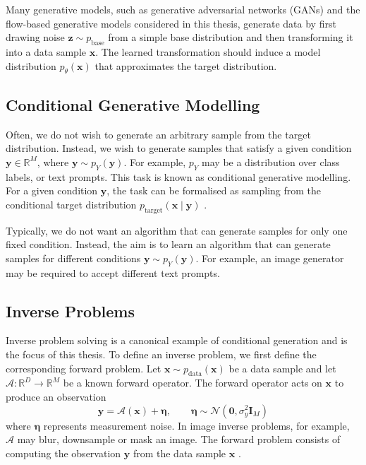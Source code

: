 \documentclass[12pt,a4paper]{report}
\begin{document}
Many generative models, such as generative adversarial networks (GANs) \parencite{GAN} and the flow-based generative models \parencite{NF_survey,lipman_FM,geng2025meanflowsonestepgenerative} considered in this thesis, generate data by first drawing noise $\mathbf{z}\sim p_{\mathrm{base}}$ from a simple base distribution and then transforming it into a data sample $\mathbf{x}$. The learned transformation should induce a model distribution $p_{\theta}(\mathbf{x})$ that approximates the target distribution. 

\subsection{Conditional Generative Modelling}
\label{subsec:conditional_generative_modelling}

Often, we do not wish to generate an arbitrary sample from the target distribution. Instead, we wish to generate samples that satisfy a given condition $\mathbf{y}\in\mathbb{R}^{M}$, where $\mathbf{y}\sim p_{Y}(\mathbf{y})$. For example, $p_{Y}$ may be a distribution over class labels, or text prompts. This task is known as conditional generative modelling. For a given condition $\mathbf{y}$, the task can be formalised as sampling from the conditional target distribution $p_{\mathrm{target}}(\mathbf{x}\mid\mathbf{y})$ \parencite{mit_FM}.

Typically, we do not want an algorithm that can generate samples for only one fixed condition. Instead, the aim is to learn an algorithm that can generate samples for different conditions $\mathbf{y}\sim p_Y(\mathbf{y})$. For example, an image generator may be required to accept different text prompts.

\subsection{Inverse Problems}
\label{subsec:inverse_problems}

Inverse problem solving is a canonical example of conditional generation and is the focus of this thesis. To define an inverse problem, we first define the corresponding forward problem. Let $\mathbf{x}\sim p_{\mathrm{data}}(\mathbf{x})$ be a data sample and let $\mathcal{A}:\mathbb{R}^{D}\rightarrow\mathbb{R}^{M}$ be a known forward operator. The forward operator acts on $\mathbf{x}$ to produce an observation
\begin{equation}
\mathbf{y}
=
\mathcal{A}(\mathbf{x})+\boldsymbol{\eta},
\qquad
\boldsymbol{\eta}
\sim
\mathcal{N}(\mathbf{0},\sigma_y^2\mathbf{I}_{M})
\label{eq:forward_problem}
\end{equation}
where $\boldsymbol{\eta}$ represents measurement noise. In image inverse problems, for example, $\mathcal{A}$ may blur, downsample or mask an image. The forward problem consists of computing the observation $\mathbf{y}$ from the data sample $\mathbf{x}$ \parencite{ongie2020deeplearningtechniquesinverse}.
\end{document}
